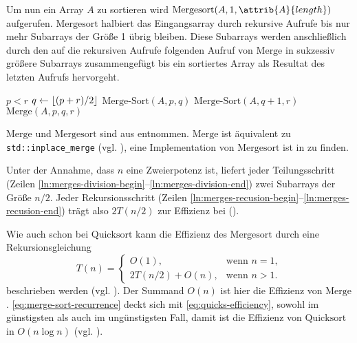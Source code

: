Um nun ein Array $A$ zu sortieren wird $\text{Mergesort}(A, 1, \attrib{A}{length})$ aufgerufen. $\text{Mergesort}$ halbiert das Eingangsarray durch rekursive Aufrufe bis nur mehr Subarrays der Größe 1 übrig bleiben. Diese Subarrays werden anschließlich durch den auf die rekursiven Aufrufe folgenden Aufruf von $\text{Merge}$ in sukzessiv größere Subarrays zusammengefügt bis ein sortiertes Array als Resultat des letzten Aufrufs hervorgeht.

\begin{codebox}
    \li \If $p < r$
    \li     \Do
                $q \gets \left\lfloor (p + r) / 2 \right\rfloor$\label{ln:merges-division-begin}
    \li         $\text{Merge-Sort}(A, p, q)$\label{ln:merges-recusion-begin}
    \li         $\text{Merge-Sort}(A, q + 1, r)$\label{ln:merges-division-end}\label{ln:merges-recusion-end}
    \li         $\text{Merge}(A, p, q, r)$
            \End
\end{codebox}

$\text{Merge}$ und $\text{Mergesort}$ sind aus \cite[33f]{clrs2001} entnommen. $\text{Merge}$ ist äquivalent zu \lstinline{std::inplace_merge} (vgl. \cite[929]{ISO-C++17}), eine Implementation von $\text{Mergesort}$ ist in  zu finden.

Unter der Annahme, dass $n$ eine Zweierpotenz ist, liefert jeder Teilungsschritt (Zeilen \ref{ln:merges-division-begin}--\ref{ln:merges-division-end}) zwei Subarrays der Größe $n / 2$. Jeder Rekursionsschritt (Zeilen \ref{ln:merges-recusion-begin}--\ref{ln:merges-recusion-end}) trägt also $2T(n / 2)$ zur Effizienz bei (\cite[36]{clrs2001}).

Wie auch schon bei $\text{Quicksort}$ kann die Effizienz des $\text{Mergesort}$ durch eine Rekursionsgleichung
\begin{equation}\label{eq:merge-sort-recurrence}
    T(n) = \begin{cases}
        O(1), & \text{wenn $n = 1$},\\
        2T(n/2) + O(n), & \text{wenn $n > 1$}.
    \end{cases}
\end{equation}
beschrieben werden (vgl. \cite[36]{clrs2001}). Der Summand $O(n)$ ist hier die Effizienz von $\text{Merge}$. \eqref{eq:merge-sort-recurrence} deckt sich mit \eqref{eq:quicks-efficiency}, sowohl im günstigsten als auch im ungünstigsten Fall, damit ist die Effizienz von $\text{Quicksort}$ in $O(n \log n)$ (vgl. \cite[36]{clrs2001}).
